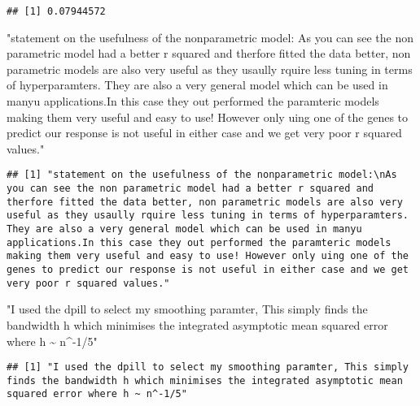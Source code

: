 \documentclass[
]{article}
\newenvironment{Shaded}{\begin{snugshade}}{\end{snugshade}}
\newcommand{\StringTok}[1]{\textcolor[rgb]{0.31,0.60,0.02}{#1}}
\begin{document}
\begin{verbatim}
## [1] 0.07944572
\end{verbatim}

\begin{Shaded}
\begin{Highlighting}[]
\StringTok{"statement on the usefulness of the nonparametric model:}
\StringTok{As you can see the non parametric model had a better r squared and therfore fitted the data better, non parametric models are also very useful as they usaully rquire less tuning in terms of hyperparamters. They are also a very general model which can be used in manyu applications.In this case they out performed the paramteric models making them very useful and easy to use! However only uing one of the genes to predict our response is not useful in either case and we get very poor r squared values."}
\end{Highlighting}
\end{Shaded}

\begin{verbatim}
## [1] "statement on the usefulness of the nonparametric model:\nAs you can see the non parametric model had a better r squared and therfore fitted the data better, non parametric models are also very useful as they usaully rquire less tuning in terms of hyperparamters. They are also a very general model which can be used in manyu applications.In this case they out performed the paramteric models making them very useful and easy to use! However only uing one of the genes to predict our response is not useful in either case and we get very poor r squared values."
\end{verbatim}

\begin{Shaded}
\begin{Highlighting}[]
\StringTok{"I used the dpill to select my smoothing paramter, This simply finds the bandwidth h which minimises the integrated asymptotic mean squared error where h \textasciitilde{} n\^{}{-}1/5"}
\end{Highlighting}
\end{Shaded}

\begin{verbatim}
## [1] "I used the dpill to select my smoothing paramter, This simply finds the bandwidth h which minimises the integrated asymptotic mean squared error where h ~ n^-1/5"
\end{verbatim}
\end{document}

